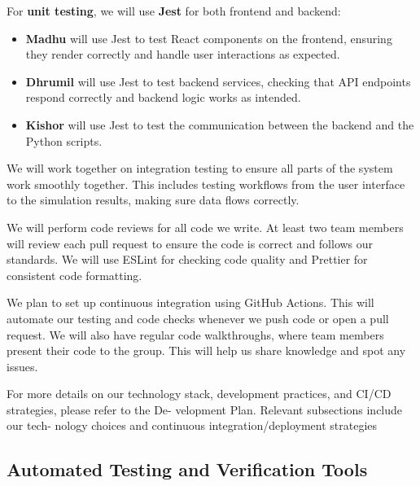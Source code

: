 \documentclass[12pt, titlepage]{article}
\begin{document}
For \textbf{unit testing}, we will use \textbf{Jest} for both frontend and backend:
\begin{itemize}
    \item \textbf{Madhu} will use Jest to test React components on the frontend, ensuring they render correctly and handle user interactions as expected.
    \item \textbf{Dhrumil} will use Jest to test backend services, checking that API endpoints respond correctly and backend logic works as intended.
    \item \textbf{Kishor} will use Jest to test the communication between the backend and the Python scripts.
\end{itemize}

We will work together on integration testing to ensure all parts of the system work smoothly together. This includes testing workflows from the user interface to the simulation results, making sure data flows correctly.

We will perform code reviews for all code we write. At least two team members will review each pull request to ensure the code is correct and follows our standards. We will use ESLint for checking code quality and Prettier for consistent code formatting.

We plan to set up continuous integration using GitHub Actions. This will automate our testing and code checks whenever we push code or open a pull request. We will also have regular code walkthroughs, where team members present their code to the group. This will help us share knowledge and spot any issues.

For more details on our technology stack, development
practices, and CI/CD strategies, please refer to the De-
velopment Plan. Relevant subsections include our tech-
nology choices and continuous integration/deployment
strategies

\subsection{Automated Testing and Verification Tools}
\end{document}
